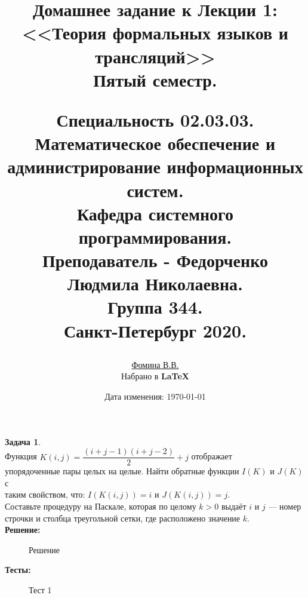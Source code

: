\documentclass[a4paper,12pt]{article}
\author{
	\href{https://vk.com/victoriaisthebestgirl}{Фомина В.В.}\\ 
	Набрано в {\bf\LaTeX}
}
\title{
	Домашнее задание к Лекции 1:\\
	 <<Теория формальных языков и трансляций>>\\
	Пятый семестр.
	\begin{center}
		\normalsize
		Специальность 02.03.03.\\
		Математическое обеспечение и администрирование информационных систем.\\
		Кафедра системного программирования.\\
		Преподаватель - Федорченко Людмила Николаевна.\\
		Группа 344.\\
		Санкт-Петербург 2020.
	\end{center}
}
\date{Дата изменения: \today\quad\currenttime}
\theoremstyle{definition} %
\theoremstyle{definition} %
\newtheorem{problem}{Задача}[section]
\theoremstyle{remark} %
\begin{document}
	
\maketitle
\newpage

\newpage

\section{}

\begin{problem}\ \\[2ex]
	Функция $K(i, j) = \dfrac{(i + j - 1)(i + j - 2)}{2} + j$ отображает \\[1ex]
	 упорядоченные пары целых на целые. Найти обратные функции $I(K)$ и $J(K)$ с \\[1ex]
	 таким свойством, что: $I(K(i, j)) = i$ и $J(K(i, j)) = j.$ \\[1ex]
	 Составьте процедуру на Паскале, которая по целому $k > 0$ выдаёт $i$ и $j$ — номер \\[1ex]
	 строчки и столбца треугольной сетки, где расположено значение $k$. \\[5ex]
	 
	 \textbf{Решение:} \\[2ex]
	 
	 \begin{figure}[h]
	 	\caption{Решение}	 	
	 \end{figure}
 
\newpage
 
 	\textbf{Тесты:} \\[2ex]
 	
 	\begin{figure}[h]
 		\caption{Тест 1}	 	
 	\end{figure}
 

\end{problem}
\end{document}
